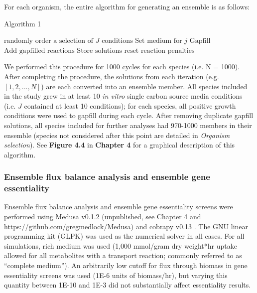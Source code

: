 \documentclass[11pt,twocolumn,notitlepage,openany,twoside]{book}
\begin{document}
\begin{refsection}
For each organism, the entire algorithm for generating an ensemble is as follows:

\begin{algorithm}
  \caption{Algorithm 1}
  \begin{algorithmic}[1]
        \State $\mbox{randomly order a selection of $J$ conditions}$
          \State $\mbox{Set medium for $j$}$
          \State $\mbox{Gapfill}$
          \State $\mbox{Add gapfilled reactions}$
        \EndFor
        \State $\mbox{Store solutions}$
        \State $\mbox{reset reaction penalties}$
      \EndFor
    \EndProcedure
  \end{algorithmic}
\end{algorithm}

We performed this procedure for 1000 cycles for each species (i.e. N = 1000). After completing the procedure, the solutions from each iteration (e.g. $[1,2,...,N]$) are each converted into an ensemble member. All species included in the study grew in at least 10 \textit{in vitro} single carbon source media conditions (i.e. $J$ contained at least 10 conditions); for each species, all positive growth conditions were used to gapfill during each cycle. After removing duplicate gapfill solutions, all species included for further analyses had 970-1000 members in their ensemble (species not considered after this point are detailed in \textit{Organism selection}). See \textbf{Figure 4.4} in \textbf{Chapter 4} for a graphical description of this algorithm.

\subsubsection{Ensemble flux balance analysis and ensemble gene essentiality}

Ensemble flux balance analysis and ensemble gene essentiality screens were performed using Medusa v0.1.2 (unpublished, see Chapter 4 and https://github.com/gregmedlock/Medusa) and cobrapy v0.13 \cite{Ebrahim2013-eb}. The GNU linear programming kit (GLPK) was used as the numerical solver in all cases. For all simulations, rich medium was used (1,000 mmol/gram dry weight*hr uptake allowed for all metabolites with a transport reaction; commonly referred to as “complete medium”). An arbitrarily low cutoff for flux through biomass in gene essentiality screens was used (1E-6 units of biomass/hr), but varying this quantity between 1E-10 and 1E-3 did not substantially affect essentiality results.


\end{refsection}
\end{document}
